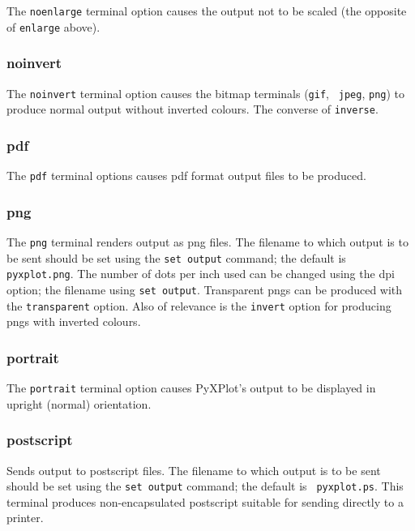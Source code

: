 The {\tt noenlarge} terminal option causes the output not to be scaled (the
opposite of {\tt enlarge} above).

\subsubsection{noinvert}

The {\tt noinvert} terminal option causes the bitmap terminals ({\tt gif}, {\tt
jpeg}, {\tt png}) to produce normal output without inverted colours. The
converse of {\tt inverse}.


\subsubsection{pdf}

The {\tt pdf} terminal options causes pdf format output files to be produced.

\subsubsection{png}

The {\tt png} terminal renders output as png files. The filename to which output
is to be sent should be set using the {\tt set output} command; the default is
{\tt pyxplot.png}. The number of dots per inch used can be changed using the dpi
option; the filename using {\tt set output}. Transparent pngs can be produced
with the {\tt transparent} option. Also of relevance is the {\tt invert} option
for producing pngs with inverted colours.


\subsubsection{portrait}

The {\tt portrait} terminal option causes PyXPlot's output to be displayed in
upright (normal) orientation.
 

\subsubsection{postscript}

Sends output to postscript files. The filename to which output is to be sent
should be set using the {\tt set output} command; the default is {\tt
pyxplot.ps}.  This terminal produces non-encapsulated postscript suitable for
sending directly to a printer.

